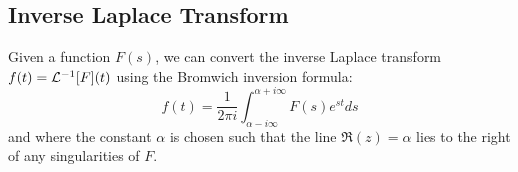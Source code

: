 \documentclass[../Main.tex]{subfiles}
\begin{document}
\subsection{Inverse Laplace Transform}
\begin{proposition}
    Given a function $F(s)$, we can convert the inverse Laplace transform $f(t) = \mathcal{L}^{-1}[F](t)$ using the Bromwich inversion formula:
    \begin{equation*}
        f(t) = \frac1{2\pi i} \int_{\alpha - i \infty}^{\alpha + i \infty} F(s) e^{st} ds
    \end{equation*}
    and where the constant $\alpha$ is chosen such that the line $\Re(z) = \alpha$ lies to the right of any singularities of $F$.
    \label{propLaplaceInverse}
\end{proposition}
\end{document}
